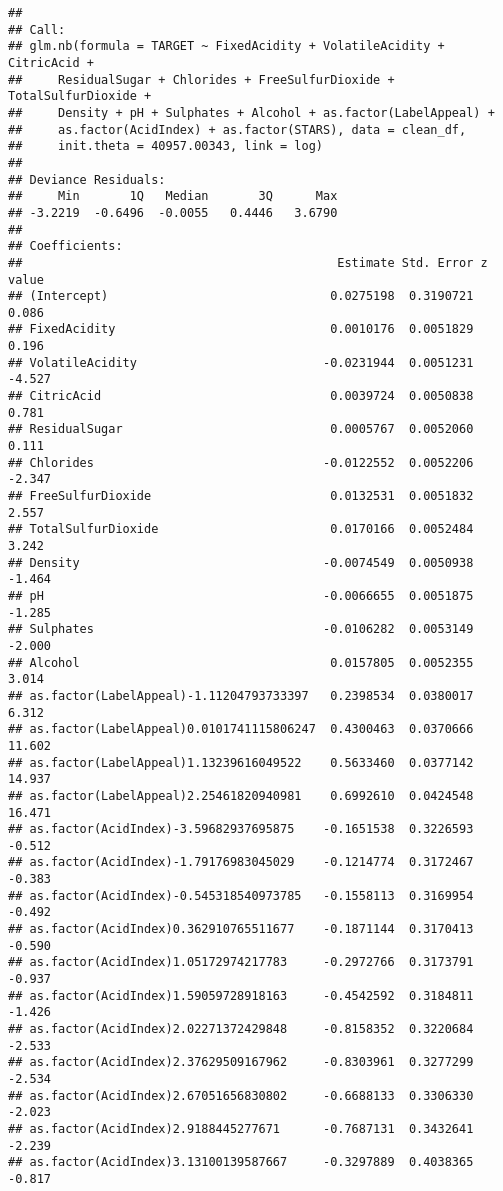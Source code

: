 \documentclass[
]{article}
\begin{document}
\begin{verbatim}
## 
## Call:
## glm.nb(formula = TARGET ~ FixedAcidity + VolatileAcidity + CitricAcid + 
##     ResidualSugar + Chlorides + FreeSulfurDioxide + TotalSulfurDioxide + 
##     Density + pH + Sulphates + Alcohol + as.factor(LabelAppeal) + 
##     as.factor(AcidIndex) + as.factor(STARS), data = clean_df, 
##     init.theta = 40957.00343, link = log)
## 
## Deviance Residuals: 
##     Min       1Q   Median       3Q      Max  
## -3.2219  -0.6496  -0.0055   0.4446   3.6790  
## 
## Coefficients:
##                                            Estimate Std. Error z value
## (Intercept)                               0.0275198  0.3190721   0.086
## FixedAcidity                              0.0010176  0.0051829   0.196
## VolatileAcidity                          -0.0231944  0.0051231  -4.527
## CitricAcid                                0.0039724  0.0050838   0.781
## ResidualSugar                             0.0005767  0.0052060   0.111
## Chlorides                                -0.0122552  0.0052206  -2.347
## FreeSulfurDioxide                         0.0132531  0.0051832   2.557
## TotalSulfurDioxide                        0.0170166  0.0052484   3.242
## Density                                  -0.0074549  0.0050938  -1.464
## pH                                       -0.0066655  0.0051875  -1.285
## Sulphates                                -0.0106282  0.0053149  -2.000
## Alcohol                                   0.0157805  0.0052355   3.014
## as.factor(LabelAppeal)-1.11204793733397   0.2398534  0.0380017   6.312
## as.factor(LabelAppeal)0.0101741115806247  0.4300463  0.0370666  11.602
## as.factor(LabelAppeal)1.13239616049522    0.5633460  0.0377142  14.937
## as.factor(LabelAppeal)2.25461820940981    0.6992610  0.0424548  16.471
## as.factor(AcidIndex)-3.59682937695875    -0.1651538  0.3226593  -0.512
## as.factor(AcidIndex)-1.79176983045029    -0.1214774  0.3172467  -0.383
## as.factor(AcidIndex)-0.545318540973785   -0.1558113  0.3169954  -0.492
## as.factor(AcidIndex)0.362910765511677    -0.1871144  0.3170413  -0.590
## as.factor(AcidIndex)1.05172974217783     -0.2972766  0.3173791  -0.937
## as.factor(AcidIndex)1.59059728918163     -0.4542592  0.3184811  -1.426
## as.factor(AcidIndex)2.02271372429848     -0.8158352  0.3220684  -2.533
## as.factor(AcidIndex)2.37629509167962     -0.8303961  0.3277299  -2.534
## as.factor(AcidIndex)2.67051656830802     -0.6688133  0.3306330  -2.023
## as.factor(AcidIndex)2.9188445277671      -0.7687131  0.3432641  -2.239
## as.factor(AcidIndex)3.13100139587667     -0.3297889  0.4038365  -0.817

\end{verbatim}
\end{document}
